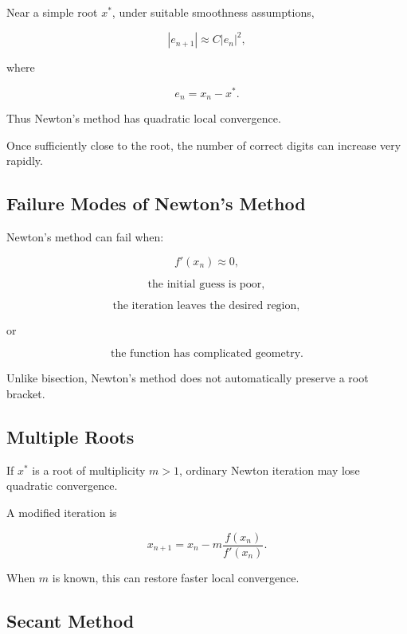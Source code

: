 Near a simple root \(x^*\), under suitable smoothness assumptions,

\[
\boxed{
|e_{n+1}|
\approx
C|e_n|^2,
}
\]

where

\[
e_n=x_n-x^*.
\]

Thus Newton's method has quadratic local convergence.

Once sufficiently close to the root, the number of correct digits can
increase very rapidly.

\subsection{Failure Modes of Newton's Method}
\label{subsec:newton-failure}

Newton's method can fail when:

\[
\boxed{
f'(x_n)\approx0,
}
\]

\[
\boxed{
\text{the initial guess is poor},
}
\]

\[
\boxed{
\text{the iteration leaves the desired region},
}
\]

or

\[
\boxed{
\text{the function has complicated geometry}.
}
\]

Unlike bisection, Newton's method does not automatically preserve a root
bracket.

\subsection{Multiple Roots}
\label{subsec:newton-multiple-roots}

If \(x^*\) is a root of multiplicity \(m>1\), ordinary Newton iteration may
lose quadratic convergence.

A modified iteration is

\[
\boxed{
x_{n+1}
=
x_n
-
m
\frac{
f(x_n)
}{
f'(x_n)
}.
}
\]

When \(m\) is known, this can restore faster local convergence.

\subsection{Secant Method}
\label{subsec:secant-method}

